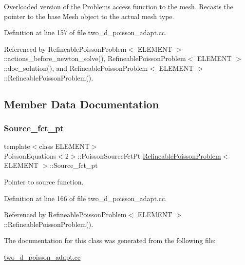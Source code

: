Overloaded version of the Problem\textquotesingle{}s access function to the mesh. Recasts the pointer to the base Mesh object to the actual mesh type. 



Definition at line 157 of file two\+\_\+d\+\_\+poisson\+\_\+adapt.\+cc.



Referenced by Refineable\+Poisson\+Problem$<$ E\+L\+E\+M\+E\+N\+T $>$\+::actions\+\_\+before\+\_\+newton\+\_\+solve(), Refineable\+Poisson\+Problem$<$ E\+L\+E\+M\+E\+N\+T $>$\+::doc\+\_\+solution(), and Refineable\+Poisson\+Problem$<$ E\+L\+E\+M\+E\+N\+T $>$\+::\+Refineable\+Poisson\+Problem().



\subsection{Member Data Documentation}
\mbox{\label{classRefineablePoissonProblem_abaf852221a8673550f96bbb507d6b05a}} 
\subsubsection{\texorpdfstring{Source\+\_\+fct\+\_\+pt}{Source\_fct\_pt}}
{\footnotesize\ttfamily template$<$class E\+L\+E\+M\+E\+NT$>$ \\
Poisson\+Equations$<$2$>$\+::Poisson\+Source\+Fct\+Pt \hyperlink{classRefineablePoissonProblem}{Refineable\+Poisson\+Problem}$<$ E\+L\+E\+M\+E\+NT $>$\+::Source\+\_\+fct\+\_\+pt\hspace{0.3cm}{\ttfamily [private]}}



Pointer to source function. 



Definition at line 166 of file two\+\_\+d\+\_\+poisson\+\_\+adapt.\+cc.



Referenced by Refineable\+Poisson\+Problem$<$ E\+L\+E\+M\+E\+N\+T $>$\+::\+Refineable\+Poisson\+Problem().



The documentation for this class was generated from the following file\+:\begin{DoxyCompactItemize}
\item 
\hyperlink{two__d__poisson__adapt_8cc}{two\+\_\+d\+\_\+poisson\+\_\+adapt.\+cc}\end{DoxyCompactItemize}
